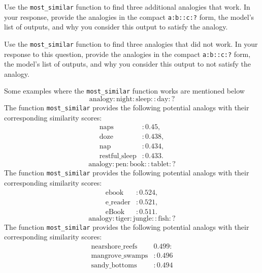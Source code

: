\documentclass[a4paper,10pt]{article}
\begin{document}
\vspace{5pt}
\begin{taskbox}
 Use the \texttt{most\_similar} function to find three additional analogies that work. In your response, provide the analogies in the compact \texttt{a:b::c:?} form, the model's list of outputs, and why you consider this output to satisfy the analogy.



 Use the \texttt{most\_similar} function to find three analogies that did not work. In your response to this question, provide the analogies in the compact \texttt{a:b::c:?} form, the model's list of outputs, and why you consider this output to not satisfy the analogy.


\end{taskbox}
\begin{answerbox}
    Some examples where the \texttt{most\_similar} function works are mentioned below
\[
\text{analogy} :  \text{night} : \text{sleep} :: \text{day} : ?
\]
The function \texttt{most\_similar} provides the following potential analogs with their corresponding similarity scores:
\begin{align*}
    \text{naps} & : 0.45, \\
    \text{doze} & : 0.438, \\
    \text{nap} & : 0.434, \\
    \text{restful\_sleep} & : 0.433.
\end{align*}
\[
\text{analogy} :  \text{pen}:\text{book}::\text{tablet}:?
\]
The function \texttt{most\_similar} provides the following potential analogs with their corresponding similarity scores:
\begin{align*}
    \text{ebook} & : 0.524, \\
    \text{e\_reader} & : 0.521, \\
    \text{eBook} & : 0.511.
\end{align*}
\[
\text{analogy} : \text{tiger} :\text{jungle} :: \text{fish}:? 
\]
The function \texttt{most\_similar} provides the following potential analogs with their corresponding similarity scores:
\begin{align*}
    \text{nearshore\_reefs} & 0.499: \\
    \text{mangrove\_swamps} & : 0.496\\
    \text{sandy\_bottoms} & : 0.494
\end{align*}
\end{answerbox}
\end{document}
